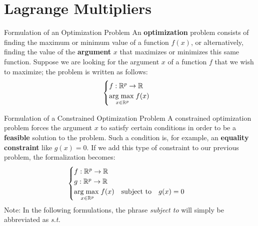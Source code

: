 \section[Lagrange Multipliers]{Lagrange Multipliers}

\begin{frame}{Formulation of an Optimization Problem}
	An \textbf{optimization} problem consists of finding the maximum or minimum value of a function $f(x)$, or alternatively, finding the value of the \textbf{argument} $x$ that maximizes or minimizes this same function. Suppose we are looking for the argument $x$ of a function $f$ that we wish to maximize; the problem is written as follows: \\
	\begin{equation}
		\begin{cases}
			f: \mathbb{R}^p \to \mathbb{R} \\
			\underset{x \in \mathbb{R}^p}{\operatorname{arg\;max}\;} f(x)
		\end{cases}
		\nonumber
	\end{equation}
\end{frame}

\begin{frame}{Formulation of a Constrained Optimization Problem}
	A constrained optimization problem forces the argument $x$ to satisfy certain conditions in order to be a \textbf{feasible} solution to the problem. Such a condition is, for example, an \textbf{equality constraint} like $g(x) = 0$. If we add this type of constraint to our previous problem, the formalization becomes:
	\begin{equation}
		\begin{cases}
			f: \mathbb{R}^p \to \mathbb{R} \\
			g: \mathbb{R}^p \to \mathbb{R} \\
			\underset{x \in \mathbb{R}^p}{\operatorname{arg\;max}\;} f(x) \quad \text{subject to} \quad g(x) = 0
		\end{cases}
		\nonumber
	\end{equation}
	\pause
	Note: In the following formulations, the phrase \textit{subject to} will simply be abbreviated as \textit{s.t.}
\end{frame}


